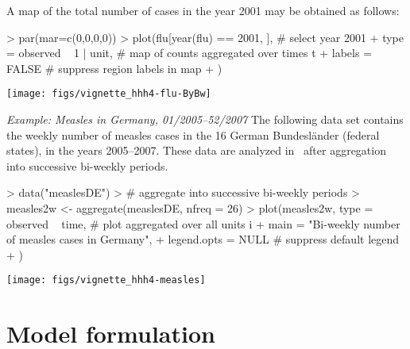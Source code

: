 \documentclass[a4paper,11pt]{article}
\newcommand{\example}[1]{\textit{Example: #1}}
\begin{document}
A map of the total number of cases in the year 2001 may be obtained as follows:
\begin{center}
\begin{Schunk}
\begin{Sinput}
> par(mar=c(0,0,0,0))
> plot(flu[year(flu) == 2001, ],    # select year 2001
+      type = observed ~ 1 | unit,  # map of counts aggregated over times t
+      labels = FALSE               # suppress region labels in map
+      )
\end{Sinput}
\end{Schunk}
\texttt{[image: figs/vignette\_hhh4-flu-ByBw]}
\end{center}

\example{Measles in Germany, 01/2005--52/2007}
The following data set contains the weekly number of measles cases in the 16
German Bundesl\"ander (federal states), in the years 2005--2007. These data 
are analyzed in~\cite{herzog-etal-2010} after aggregation into successive 
bi-weekly periods.

\begin{center}
\begin{Schunk}
\begin{Sinput}
> data("measlesDE")
> # aggregate into successive bi-weekly periods
> measles2w <- aggregate(measlesDE, nfreq = 26)
> plot(measles2w, type = observed ~ time,   # plot aggregated over all units i
+                    main = "Bi-weekly number of measles cases in Germany", 
+                    legend.opts = NULL        # suppress default legend
+                    )
\end{Sinput}
\end{Schunk}
\texttt{[image: figs/vignette\_hhh4-measles]}
\end{center}

\section{Model formulation}\label{sec:model}
\end{document}
